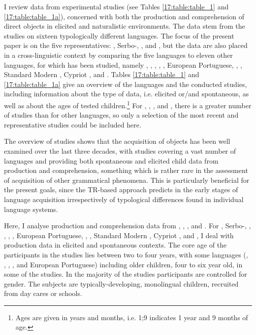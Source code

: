 \documentclass[output=paper,modfonts,newtxmath,hidelinks,]{langscibook}
\begin{document}
I review data from experimental studies (see Tables \ref{17:table:table_1} and \ref{17:table:table_1a}), concerned with both the production and comprehension of direct objects in elicited and naturalistic environments. The data stem from the studies on sixteen typologically different languages. The focus of the present paper is on the five  representatives: , Serbo-, ,  and , but the data are also placed in a cross-linguistic context by comparing the five  languages to eleven other languages, for which  has been studied, namely , , , , , European Portuguese, , , Standard Modern , Cypriot , and . Tables \ref{17:table:table_1} and \ref{17:table:table_1a} give an overview of the languages and the conducted studies, including information about the type of data, i.e. elicited or/and spontaneous, as well as about the ages of tested children.\footnote{\label{17:fn3}Ages are given in years and months, i.e. 1;9 indicates 1 year and 9 months of age.} For , , , and , there is a greater number of studies than for other languages, so only a selection of the most recent and representative studies could be included here.

The overview of studies shows that the acquisition of objects has been well examined over the last three decades, with studies covering a vast number of languages and providing both spontaneous and elicited child data from production and comprehension, something which is rather rare in the assessment of acquisition of other grammatical phenomena. This is particularly beneficial for the present goals, since the TR-based approach predicts  in the early stages of language acquisition irrespectively of typological differences found in individual language systems.\largerpage[-2]

Here, I analyse production and comprehension data from , , , and . For , Serbo-, , , , , European Portuguese, , , Standard Modern , Cypriot , and , I deal with production data in elicited and spontaneous contexts. The core age of the participants in the studies lies between two to four years, with some languages (, , , , and European Portuguese) including older children, four to six year old, in some of the studies. In the majority of the studies participants are controlled for gender. The subjects are typically-developing, monolingual children, recruited from day cares or schools.
\end{document}
